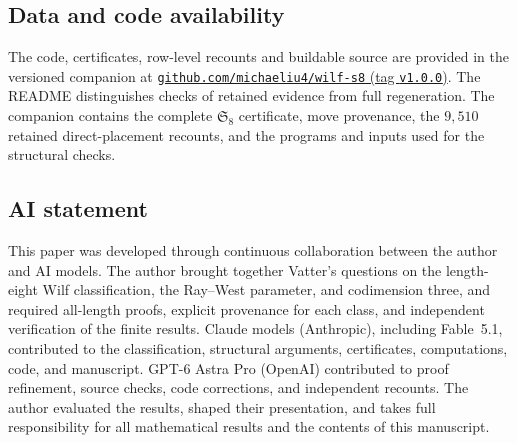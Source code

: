 \documentclass[11pt,reqno]{amsart}
\theoremstyle{plain}
\theoremstyle{definition}
\theoremstyle{remark}
\newcommand{\Sym}{\mathfrak{S}}
\begin{document}
\subsection*{Data and code availability}
The code, certificates, row-level recounts and buildable source are
provided in the versioned companion at
\href{https://github.com/michaeliu4/wilf-s8/releases/tag/v1.0.0}{\texttt{github.com/michaeliu4/wilf-s8} (tag \texttt{v1.0.0})}.
The README distinguishes checks of retained evidence from full
regeneration. The companion contains the complete $\Sym_8$ certificate,
move provenance, the $9{,}510$ retained direct-placement recounts,
and the programs and inputs used for the structural checks.

\subsection*{AI statement}
This paper was developed through continuous collaboration between the author and AI models. The author brought together Vatter's questions on the length-eight Wilf classification, the Ray--West parameter, and codimension three, and required all-length proofs, explicit provenance for each class, and independent verification of the finite results. Claude models (Anthropic), including Fable~5.1, contributed to the classification, structural arguments, certificates, computations, code, and manuscript. GPT-6 Astra Pro (OpenAI) contributed to proof refinement, source checks, code corrections, and independent recounts. The author evaluated the results, shaped their presentation, and takes full responsibility for all mathematical results and the contents of this manuscript.
\end{document}
